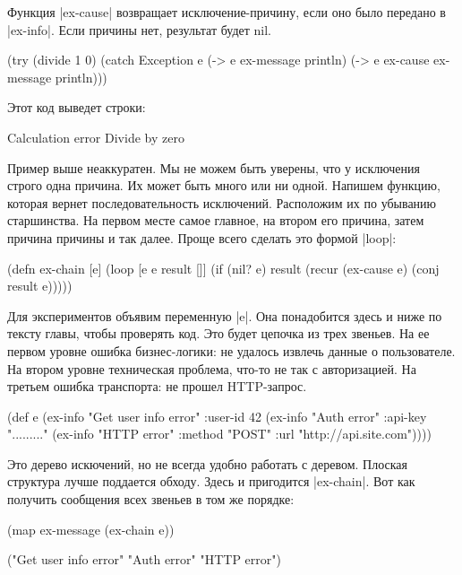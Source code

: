 Функция \spverb|ex-cause| возвращает исключение-причину, если оно было передано в
\spverb|ex-info|. Если причины нет, результат будет nil.

\begin{code}
(try
  (divide 1 0)
  (catch Exception e
    (-> e ex-message println)
    (-> e ex-cause ex-message println)))
\end{code}

Этот код выведет строки:

\begin{code}
Calculation error
Divide by zero
\end{code}

Пример выше неаккуратен. Мы не можем быть уверены, что у исключения строго одна
причина. Их может быть много или ни одной. Напишем функцию, которая вернет
последовательность исключений. Расположим их по убыванию старшинства. На первом
месте самое главное, на втором его причина, затем причина причины и так
далее. Проще всего сделать это формой \spverb|loop|:

\begin{code}
(defn ex-chain [e]
  (loop [e e
         result []]
    (if (nil? e)
      result
      (recur (ex-cause e) (conj result e)))))
\end{code}

Для экспериментов объявим переменную \spverb|e|. Она понадобится здесь и ниже по тексту
главы, чтобы проверять код. Это будет цепочка из трех звеньев. На ее первом
уровне ошибка бизнес-логики: не удалось извлечь данные о пользователе. На втором
уровне техническая проблема, что-то не так с авторизацией. На третьем ошибка
транспорта: не прошел HTTP-запрос.

\begin{code}
(def e
  (ex-info
   "Get user info error"
   {:user-id 42}
   (ex-info "Auth error"
            {:api-key "........."}
            (ex-info "HTTP error"
                     {:method "POST"
                      :url "http://api.site.com"}))))
\end{code}

Это дерево искючений, но не всегда удобно работать с деревом. Плоская структура
лучше поддается обходу. Здесь и пригодится \spverb|ex-chain|. Вот как получить
сообщения всех звеньев в том же порядке:

\begin{code}
(map ex-message (ex-chain e))

("Get user info error" "Auth error" "HTTP error")
\end{code}

